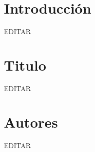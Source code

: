 \documentclass[preprint,12pt]{elsarticle}
\begin{document}

\section{Introducción} 

EDITAR\\




\section{Titulo}

EDITAR\\



\section{Autores}

EDITAR\\


\end{document}
